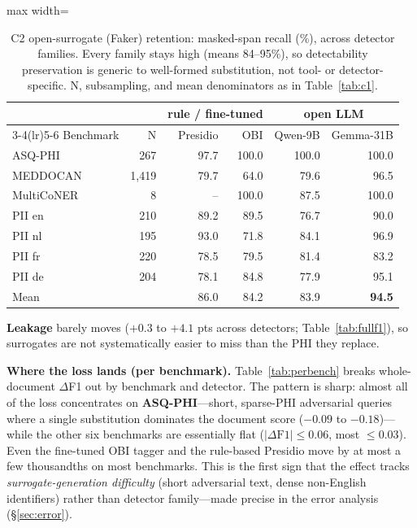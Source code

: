 \documentclass[pmlr,twocolumn,10pt]{jmlr}
\newcommand{\nk}[1]{{\footnotesize\textcolor{ckhaki}{#1}}}
\begin{document}
\begin{table}[t]\centering\small
\begin{adjustbox}{max width=\columnwidth}%
\begin{tabular}{lrrrrr}
\toprule
 & & \multicolumn{2}{c}{rule / fine-tuned} & \multicolumn{2}{c}{open LLM}\\
\cmidrule(lr){3-4}\cmidrule(lr){5-6}
Benchmark & \nk{N} & Presidio & OBI & Qwen-9B & Gemma-31B\\
\midrule
ASQ-PHI & \nk{267} & 97.7 & 100.0 & 100.0 & 100.0\\
MEDDOCAN & \nk{1{,}419} & 79.7 & 64.0 & 79.6 & 96.5\\
MultiCoNER & \nk{8} & -- & 100.0 & 87.5 & 100.0\\
PII en & \nk{210} & 89.2 & 89.5 & 76.7 & 90.0\\
PII nl & \nk{195} & 93.0 & 71.8 & 84.1 & 96.9\\
PII fr & \nk{220} & 78.5 & 79.5 & 81.4 & 83.2\\
PII de & \nk{204} & 78.1 & 84.8 & 77.9 & 95.1\\
\midrule
Mean & & 86.0 & 84.2 & 83.9 & \textbf{94.5}\\
\bottomrule
\end{tabular}
\end{adjustbox}
\caption{C2 open-surrogate (Faker) retention: masked-span recall (\%), across detector families. Every family stays high (means 84--95\%), so detectability preservation is generic to well-formed substitution, not tool- or detector-specific. \nk{N}, subsampling, and mean denominators as in Table~\ref{tab:c1}.}\label{tab:c2}
\end{table}

\textbf{Leakage} barely moves ($+0.3$ to $+4.1$ pts across detectors; Table~\ref{tab:fullf1}), so surrogates are not systematically easier to miss than the PHI they replace.

\textbf{Where the loss lands (per benchmark).} Table~\ref{tab:perbench} breaks whole-document $\Delta$F1 out by benchmark and detector. The pattern is sharp: almost all of the loss concentrates on \textbf{ASQ-PHI}---short, sparse-PHI adversarial queries where a single substitution dominates the document score ($-0.09$ to $-0.18$)---while the other six benchmarks are essentially flat ($|\Delta\text{F1}|\le0.06$, most $\le0.03$). Even the fine-tuned OBI tagger and the rule-based Presidio move by at most a few thousandths on most benchmarks. This is the first sign that the effect tracks \emph{surrogate-generation difficulty} (short adversarial text, dense non-English identifiers) rather than detector family---made precise in the error analysis (\S\ref{sec:error}).
\end{document}
